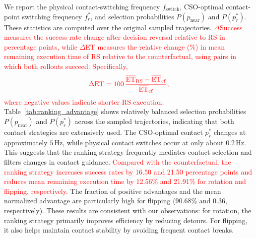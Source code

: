 We report the physical contact-switching frequency $f_{\mathrm{switch}}$, CSO-optimal contact-point switching frequency $f_r^*$, and selection probabilities $P(p_{\text{near}})$ and $P(p_r^*)$. These statistics are computed over the original sampled trajectories. \textcolor{red}{$\Delta$Success measures the success-rate change after decision reversal \textcolor{red}{relative to RS} in percentage points, while $\Delta$ET measures the  \textcolor{red}{relative change (\%)} in mean remaining execution time of RS relative to the counterfactual, using pairs in which both rollouts succeed.} \textcolor{red}{Specifically,}
\begin{equation}
\textcolor{red}{\Delta\mathrm{ET}=100\,\frac{\overline{\mathrm{ET}}_{\mathrm{RS}}-\overline{\mathrm{ET}}_{\mathrm{cf}}}{\overline{\mathrm{ET}}_{\mathrm{cf}}},}
\label{eq:ranking_delta_et}
\end{equation}
\textcolor{red}{where negative values indicate shorter RS execution.}
Table~\ref{tab:ranking_advantage} shows relatively balanced selection probabilities $P(p_{\text{near}})$ and $P(p_r^*)$ across the sampled trajectories, indicating that both contact strategies are extensively used. The CSO-optimal contact $p_r^*$ changes at approximately $5\,\mathrm{Hz}$, while physical contact switches occur at only about $0.2\,\mathrm{Hz}$. This suggests that the ranking strategy frequently mediates contact selection and filters changes in contact guidance. \textcolor{red}{Compared with the counterfactual, the ranking strategy increases success rates by 16.50 and 21.50 percentage points and reduces mean remaining execution time by 12.56\% and 21.91\% for rotation and flipping, respectively.} The fraction of positive advantages and the mean normalized advantage are particularly high for flipping ($90.68\%$ and $0.36$, respectively). These results are consistent with our observations: for rotation, the ranking strategy primarily improves efficiency by reducing detours. For flipping, it also helps maintain contact stability by avoiding frequent contact breaks.

